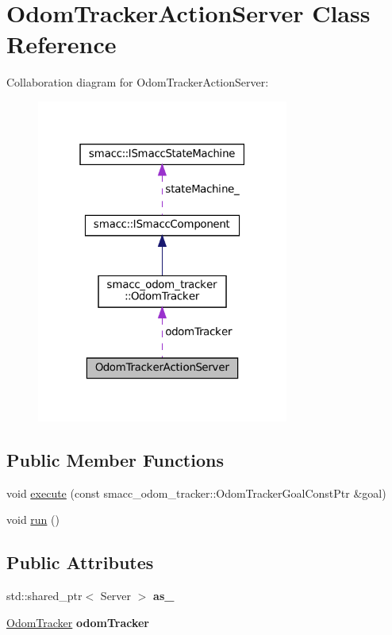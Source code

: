 \hypertarget{classOdomTrackerActionServer}{}\section{Odom\+Tracker\+Action\+Server Class Reference}
\label{classOdomTrackerActionServer}


Collaboration diagram for Odom\+Tracker\+Action\+Server\+:
\nopagebreak
\begin{figure}[H]
\begin{center}
\leavevmode
\includegraphics[width=235pt]{classOdomTrackerActionServer__coll__graph}
\end{center}
\end{figure}
\subsection*{Public Member Functions}
\begin{DoxyCompactItemize}
\item 
void \hyperlink{classOdomTrackerActionServer_af8a72e60dfa1b6224d5c0a9cc9ae68a8}{execute} (const smacc\+\_\+odom\+\_\+tracker\+::\+Odom\+Tracker\+Goal\+Const\+Ptr \&goal)
\item 
void \hyperlink{classOdomTrackerActionServer_a8ab6984c7383949a048d72437e9f79d3}{run} ()
\end{DoxyCompactItemize}
\subsection*{Public Attributes}
\begin{DoxyCompactItemize}
\item 
\mbox{\label{classOdomTrackerActionServer_a28bed1d95003d837b2b47053dbc66878}} 
std\+::shared\+\_\+ptr$<$ Server $>$ {\bfseries as\+\_\+}
\item 
\mbox{\label{classOdomTrackerActionServer_a3e5c4328d3206fbd2fd2708f0aefe651}} 
\hyperlink{classsmacc__odom__tracker_1_1OdomTracker}{Odom\+Tracker} {\bfseries odom\+Tracker}
\end{DoxyCompactItemize}



